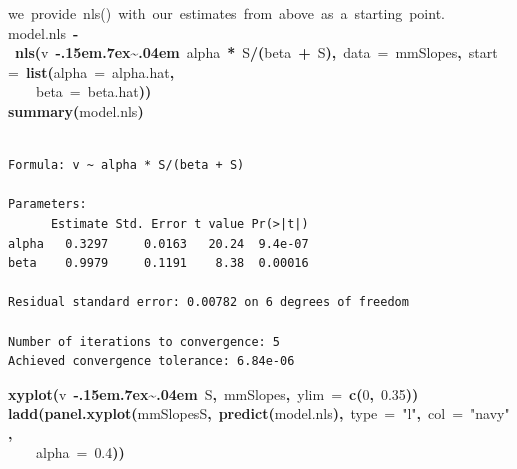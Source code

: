 \documentclass{article}
\makeatletter
\newcommand{\hlnumber}[1]{\textcolor[rgb]{0,0,0}{#1}}%
\newcommand{\hlfunctioncall}[1]{\textcolor[rgb]{0.501960784313725,0,0.329411764705882}{\textbf{#1}}}%
\newcommand{\hlstring}[1]{\textcolor[rgb]{0.6,0.6,1}{#1}}%
\newcommand{\hlkeyword}[1]{\textcolor[rgb]{0,0,0}{\textbf{#1}}}%
\newcommand{\hlargument}[1]{\textcolor[rgb]{0.690196078431373,0.250980392156863,0.0196078431372549}{#1}}%
\newcommand{\hlcomment}[1]{\textcolor[rgb]{0.180392156862745,0.6,0.341176470588235}{#1}}%
\newcommand{\hlassignement}[1]{\textcolor[rgb]{0,0,0}{\textbf{#1}}}%
\newcommand{\hlsymbol}[1]{\textcolor[rgb]{0,0,0}{#1}}%
\def\urltilda{\kern -.15em\lower .7ex\hbox{\~{}}\kern .04em}%
\newcommand{\hlstd}[1]{\textcolor[rgb]{0,0,0}{#1}}%
\newenvironment{kframe}{%
 \def\FrameCommand##1{\hskip\@totalleftmargin \hskip-\fboxsep
 \colorbox{shadecolor}{##1}\hskip-\fboxsep
     \hskip-\linewidth \hskip-\@totalleftmargin \hskip\columnwidth}%
 \MakeFramed {\advance\hsize-\width
   \@totalleftmargin\z@ \linewidth\hsize
   \@setminipage}}%
 {\par\unskip\endMakeFramed}
\newenvironment{knitrout}{}{} %
\makeatother
\begin{document}
\begin{knitrout}
\color{fgcolor}\begin{kframe}
\begin{flushleft}
\ttfamily\noindent
\hlcomment{\usebox{\hlnormalsizeboxhash}{\ }we{\ }provide{\ }nls(){\ }with{\ }our{\ }estimates{\ }from{\ }above{\ }as{\ }a{\ }starting{\ }point.}\hspace*{\fill}\\
\hlstd{}\hlsymbol{model.nls}{\ }\hlassignement{\usebox{\hlnormalsizeboxlessthan}-}{\ }\hlfunctioncall{nls}\hlkeyword{(}\hlsymbol{v}{\ }\hlkeyword{\urltilda{}}{\ }\hlsymbol{alpha}{\ }\hlkeyword{*}{\ }\hlsymbol{S}\hlkeyword{/}\hlkeyword{(}\hlsymbol{beta}{\ }\hlkeyword{+}{\ }\hlsymbol{S}\hlkeyword{)}\hlkeyword{,}{\ }\hlargument{data}{\ }\hlargument{=}{\ }\hlsymbol{mmSlopes}\hlkeyword{,}{\ }\hlargument{start}{\ }\hlargument{=}{\ }\hlfunctioncall{list}\hlkeyword{(}\hlargument{alpha}{\ }\hlargument{=}{\ }\hlsymbol{alpha.hat}\hlkeyword{,}\hspace*{\fill}\\
\hlstd{}{\ }{\ }{\ }{\ }\hlargument{beta}{\ }\hlargument{=}{\ }\hlsymbol{beta.hat}\hlkeyword{)}\hlkeyword{)}\hspace*{\fill}\\
\hlstd{}\hlfunctioncall{summary}\hlkeyword{(}\hlsymbol{model.nls}\hlkeyword{)}\mbox{}
\normalfont
\end{flushleft}
\begin{verbatim}

Formula: v ~ alpha * S/(beta + S)

Parameters:
      Estimate Std. Error t value Pr(>|t|)
alpha   0.3297     0.0163   20.24  9.4e-07
beta    0.9979     0.1191    8.38  0.00016

Residual standard error: 0.00782 on 6 degrees of freedom

Number of iterations to convergence: 5 
Achieved convergence tolerance: 6.84e-06 

\end{verbatim}
\begin{flushleft}
\ttfamily\noindent
\hlfunctioncall{xyplot}\hlkeyword{(}\hlsymbol{v}{\ }\hlkeyword{\urltilda{}}{\ }\hlsymbol{S}\hlkeyword{,}{\ }\hlsymbol{mmSlopes}\hlkeyword{,}{\ }\hlargument{ylim}{\ }\hlargument{=}{\ }\hlfunctioncall{c}\hlkeyword{(}\hlnumber{0}\hlkeyword{,}{\ }\hlnumber{0.35}\hlkeyword{)}\hlkeyword{)}\hspace*{\fill}\\
\hlstd{}\hlfunctioncall{ladd}\hlkeyword{(}\hlfunctioncall{panel.xyplot}\hlkeyword{(}\hlsymbol{mmSlopes}\hlkeyword{\usebox{\hlnormalsizeboxdollar}}\hlsymbol{S}\hlkeyword{,}{\ }\hlfunctioncall{predict}\hlkeyword{(}\hlsymbol{model.nls}\hlkeyword{)}\hlkeyword{,}{\ }\hlargument{type}{\ }\hlargument{=}{\ }\hlstring{"{}l"{}}\hlkeyword{,}{\ }\hlargument{col}{\ }\hlargument{=}{\ }\hlstring{"{}navy"{}}\hlkeyword{,}\hspace*{\fill}\\
\hlstd{}{\ }{\ }{\ }{\ }\hlargument{alpha}{\ }\hlargument{=}{\ }\hlnumber{0.4}\hlkeyword{)}\hlkeyword{)}\mbox{}
\normalfont
\end{flushleft}
\end{kframe}


\end{knitrout}
\end{document}
